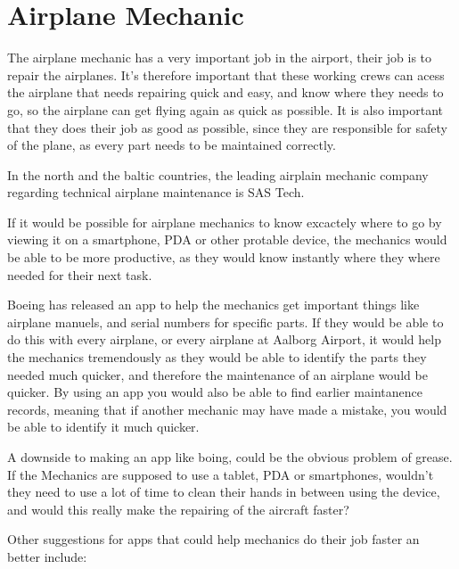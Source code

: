 \section{Airplane Mechanic}

The airplane mechanic has a very important job in the airport, their job is to repair the airplanes. It's therefore important that these working crews can acess the airplane that needs repairing quick and easy, and know where they needs to go, so the airplane can get flying again as quick as possible. It is also important that they does their job as good as possible, since they are responsible for safety of the plane, as every part needs to be maintained correctly.

In the north and the baltic countries, the leading airplain mechanic company regarding technical airplane maintenance is SAS Tech.

If it would be possible for airplane mechanics to know excactely where to go by viewing it on a smartphone, PDA or other protable device, the mechanics would be able to be more productive, as they would know instantly where they where needed for their next task.

Boeing has released an app to help the mechanics get important things like airplane manuels, and serial numbers for specific parts. If they would be able to do this with every airplane, or every airplane at Aalborg Airport, it would help the mechanics tremendously as they would be able to identify the parts they needed much quicker, and therefore the maintenance of an airplane would be quicker. By using an app you would also be able to find earlier maintanence records, meaning that if another mechanic may have made a mistake, you would be able to identify it much quicker.

A downside to making an app like boing, could be the obvious problem of grease. If the Mechanics are supposed to use a tablet, PDA or smartphones, wouldn't they need to use a lot of time to clean their hands in between using the device, and would this really make the repairing of the aircraft faster?

Other suggestions for apps that could help mechanics do their job faster an better include:
